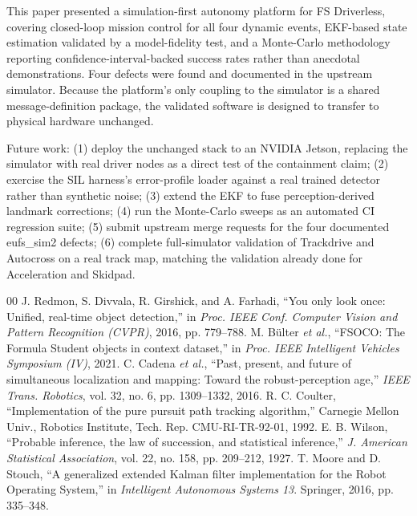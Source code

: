 \documentclass[conference]{IEEEtran}
\begin{document}
This paper presented a simulation-first autonomy platform for FS Driverless, covering closed-loop mission control for all four dynamic events, EKF-based state estimation validated by a model-fidelity test, and a Monte-Carlo methodology reporting confidence-interval-backed success rates rather than anecdotal demonstrations. Four defects were found and documented in the upstream simulator. Because the platform's only coupling to the simulator is a shared message-definition package, the validated software is designed to transfer to physical hardware unchanged.

Future work: (1) deploy the unchanged stack to an NVIDIA Jetson, replacing the simulator with real driver nodes as a direct test of the containment claim; (2) exercise the SIL harness's error-profile loader against a real trained detector rather than synthetic noise; (3) extend the EKF to fuse perception-derived landmark corrections; (4) run the Monte-Carlo sweeps as an automated CI regression suite; (5) submit upstream merge requests for the four documented eufs\_sim2 defects; (6) complete full-simulator validation of Trackdrive and Autocross on a real track map, matching the validation already done for Acceleration and Skidpad.

\begin{thebibliography}{00}
 J. Redmon, S. Divvala, R. Girshick, and A. Farhadi, ``You only look once: Unified, real-time object detection,'' in \textit{Proc. IEEE Conf. Computer Vision and Pattern Recognition (CVPR)}, 2016, pp. 779--788.
 M. B\"ulter \textit{et al.}, ``FSOCO: The Formula Student objects in context dataset,'' in \textit{Proc. IEEE Intelligent Vehicles Symposium (IV)}, 2021.
 C. Cadena \textit{et al.}, ``Past, present, and future of simultaneous localization and mapping: Toward the robust-perception age,'' \textit{IEEE Trans. Robotics}, vol. 32, no. 6, pp. 1309--1332, 2016.
 R. C. Coulter, ``Implementation of the pure pursuit path tracking algorithm,'' Carnegie Mellon Univ., Robotics Institute, Tech. Rep. CMU-RI-TR-92-01, 1992.
 E. B. Wilson, ``Probable inference, the law of succession, and statistical inference,'' \textit{J. American Statistical Association}, vol. 22, no. 158, pp. 209--212, 1927.
 T. Moore and D. Stouch, ``A generalized extended Kalman filter implementation for the Robot Operating System,'' in \textit{Intelligent Autonomous Systems 13}. Springer, 2016, pp. 335--348.
\end{thebibliography}
\end{document}
